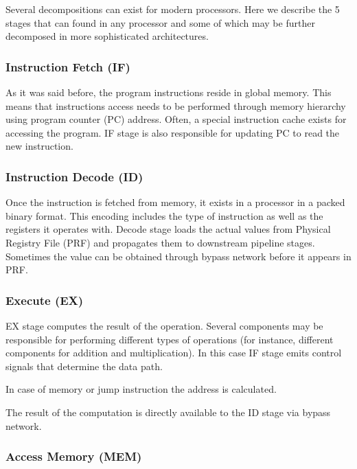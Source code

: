 
Several decompositions can exist for modern processors. Here we describe the 5 stages that can found in any processor and some of which may be further decomposed in more sophisticated architectures.

\subsubsection{Instruction Fetch (IF)}

As it was said before, the program instructions reside in global memory. This means that instructions access needs to be performed through memory hierarchy using program counter (PC) address. Often, a special instruction cache exists for accessing the program. IF stage is also responsible for updating PC to read the new instruction.

\subsubsection{Instruction Decode (ID)}

Once the instruction is fetched from memory, it exists in a processor in a packed binary format. This encoding includes the type of instruction as well as the registers it operates with. Decode stage loads the actual values from Physical Registry File (PRF) and propagates them to downstream pipeline stages. Sometimes the value can be obtained through bypass network before it appears in PRF.

\subsubsection{Execute (EX)}

EX stage computes the result of the operation. Several components may be responsible for performing different types of operations (for instance, different components for addition and multiplication). In this case IF stage emits control signals that determine the data path.

In case of memory or jump instruction the address is calculated.

The result of the computation is directly available to the ID stage via bypass network.

\subsubsection{Access Memory (MEM)}


